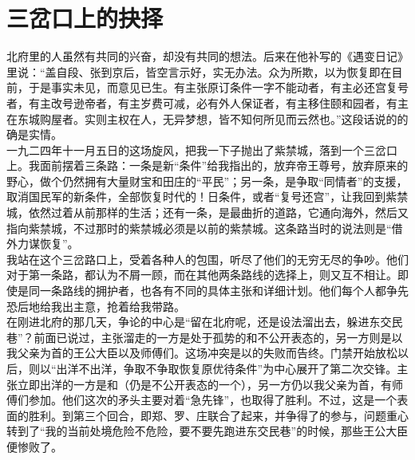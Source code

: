 \fancyhead[RO]{} %
\fancyhead[LE]{} %
\chapter*{三岔口上的抉择}
\thispagestyle{empty}
北府里的人虽然有共同的兴奋，却没有共同的想法。后来在他补写的《遇变日记》里说：“盖自段、张到京后，皆空言示好，实无办法。众为所欺，以为恢复即在目前，于是事实未见，而意见已生。有主张原订条件一字不能动者，有主必还宫复号者，有主改号逊帝者，有主岁费可减，必有外人保证者，有主移住颐和园者，有主在东城购屋者。实则主权在人，无异梦想，皆不知何所见而云然也。”这段话说的的确是实情。\\

一九二四年十一月五日的这场旋风，把我一下子抛出了紫禁城，落到一个三岔口上。我面前摆着三条路：一条是新“条件”给我指出的，放弃帝王尊号，放弃原来的野心，做个仍然拥有大量财宝和田庄的“平民”；另一条，是争取“同情者”的支援，取消国民军的新条件，全部恢复时代的！日条件，或者“复号还宫”，让我回到紫禁城，依然过着从前那样的生活；还有一条，是最曲折的道路，它通向海外，然后又指向紫禁城，不过那时的紫禁城必须是以前的紫禁城。这条路当时的说法则是“借外力谋恢复”。\\

我站在这个三岔路口上，受着各种人的包围，听尽了他们的无穷无尽的争吵。他们对于第一条路，都认为不屑一顾，而在其他两条路线的选择上，则又互不相让。即使是同一条路线的拥护者，也各有不同的具体主张和详细计划。他们每个人都争先恐后地给我出主意，抢着给我带路。\\

在刚进北府的那几天，争论的中心是“留在北府呢，还是设法溜出去，躲进东交民巷”？前面已说过，主张溜走的一方是处于孤势的和不公开表态的，另一方则是以我父亲为首的王公大臣以及师傅们。这场冲突是以的失败而告终。门禁开始放松以后，则以“出洋不出洋，争取不争取恢复原优待条件”为中心展开了第二次交锋。主张立即出洋的一方是和（仍是不公开表态的一个），另一方仍以我父亲为首，有师傅们参加。他们这次的矛头主要对着“急先锋”，也取得了胜利。不过，这是一个表面的胜利。到第三个回合，即郑、罗、庄联合了起来，并争得了的参与，问题重心转到了“我的当前处境危险不危险，要不要先跑进东交民巷”的时候，那些王公大臣便惨败了。\\


